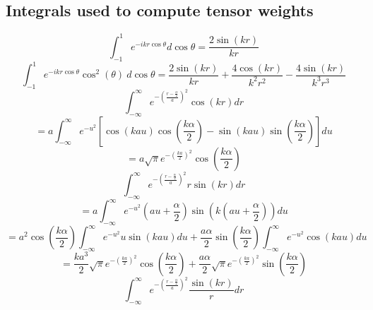 \documentclass[letterpaper,twocolumn,amsmath,amssymb,prb]{revtex4-1}
\begin{document}
\begin{widetext}
\[{}\]
\subsection{Integrals used to compute tensor weights}
\begin{equation}{\int_{-1}^{1}{e^{-ikr\cos{\theta}}d{\cos{\theta}}}=\frac{2\sin(kr)}{kr}}\end{equation} 
\[{}\]
\begin{equation}{\int_{-1}^{1}{e^{-ikr\cos{\theta}}\cos^2(\theta)~d{\cos{\theta}}}=\frac{2\sin(kr)}{kr}+\frac{4\cos(kr)}{k^2r^2}-\frac{4\sin(kr)}{k^3r^3}}\end{equation} 
\[{}\]
\[{}\]
\begin{equation}{\int_{-\infty}^{\infty}{e^{-\left(\frac{r-\frac{\alpha}{2}}{a}\right)^2}\cos(kr)d{r}}}\end{equation}
\begin{displaymath}{=a\int_{-\infty}^{\infty}{e^{-u^2}\left[\cos(kau)\cos(\frac{k\alpha}{2})-\sin(kau)\sin(\frac{k\alpha}{2})\right]d{u}}}\end{displaymath}  
\begin{equation}{=a\sqrt{\pi}e^{-\left(\frac{ka}{2}\right)^2}\cos(\frac{k\alpha}{2})}\end{equation} 
\[{}\]
\begin{equation}{\int_{-\infty}^{\infty}{e^{-\left(\frac{r-\frac{\alpha}{2}}{a}\right)^2}r\sin(kr)d{r}}}\end{equation} 
\begin{displaymath}{=a\int_{-\infty}^{\infty}{e^{-u^2}(au+\frac{\alpha}{2})\sin(k(au+\frac{\alpha}{2}))d{u}}}\end{displaymath} 
\begin{displaymath}{=a^2\cos(\frac{k\alpha}{2})\int_{-\infty}^{\infty}{e^{-u^2}u\sin(kau)d{u} +\frac{a\alpha}{2}\sin(\frac{k\alpha}{2})\int_{-\infty}^{\infty}e^{-u^2}\cos(kau)d{u}}}\end{displaymath} 
\begin{equation}{=\frac{ka^3}{2}\sqrt{\pi}e^{-\left(\frac{ka}{2}\right)^2}\cos(\frac{k\alpha}{2})+\frac{a\alpha}{2}\sqrt{\pi}e^{-\left(\frac{ka}{2}\right)^2}\sin(\frac{k\alpha}{2})}\end{equation} 
\[{}\]
\begin{equation}{\int_{-\infty}^{\infty}{e^{-\left(\frac{r-\frac{\alpha}{2}}{a}\right)^2}\frac{\sin(kr)}{r}d{r}}}\end{equation} 

\end{widetext}
\end{document}
